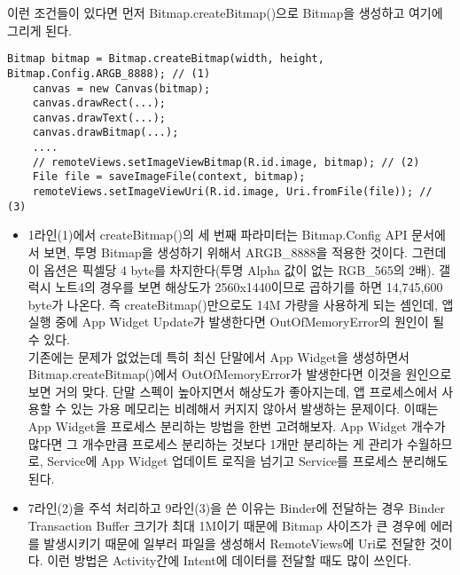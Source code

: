 이런 조건들이 있다면 먼저 Bitmap.createBitmap()으로 Bitmap을 생성하고 여기에 그리게 된다.
\begin{lstlisting}[frame=single] 
	Bitmap bitmap = Bitmap.createBitmap(width, height, Bitmap.Config.ARGB_8888); // (1)
	canvas = new Canvas(bitmap);
	canvas.drawRect(...);
	canvas.drawText(...);
	canvas.drawBitmap(...);
	....
	// remoteViews.setImageViewBitmap(R.id.image, bitmap); // (2)
	File file = saveImageFile(context, bitmap);
	remoteViews.setImageViewUri(R.id.image, Uri.fromFile(file)); // (3)
\end{lstlisting}
\begin{itemize}
\item 1라인(1)에서 createBitmap()의 세 번째 파라미터는 Bitmap.Config API 문서에서 보면, 투명 Bitmap을 생성하기 위해서 ARGB\_8888을 적용한 것이다.
그런데 이 옵션은 픽셀당 4 byte를 차지한다(투명 Alpha 값이 없는 RGB\_565의 2배). 갤럭시 노트4의 경우를 보면 해상도가 2560x1440이므로 곱하기를 하면 14,745,600 byte가 나온다. 즉 createBitmap()만으로도 14M 가량을 사용하게 되는 셈인데, 앱 실행 중에 App Widget Update가 발생한다면 OutOfMemoryError의 원인이 될 수 있다.\\

기존에는 문제가 없었는데 특히 최신 단말에서 App Widget을 생성하면서 Bitmap.createBitmap()에서 OutOfMemoryError가 발생한다면 이것을 원인으로 보면 거의 맞다.
단말 스펙이 높아지면서 해상도가 좋아지는데, 앱 프로세스에서 사용할 수 있는 가용 메모리는 비례해서 커지지 않아서 발생하는 문제이다.
이때는 App Widget을 프로세스 분리하는 방법을 한번 고려해보자.
App Widget 개수가 많다면 그 개수만큼 프로세스 분리하는 것보다 1개만 분리하는 게 관리가 수월하므로, Service에 App Widget 업데이트 로직을 넘기고 Service를 프로세스 분리해도 된다.

\item 7라인(2)을 주석 처리하고 9라인(3)을 쓴 이유는 Binder에 전달하는 경우 Binder Transaction Buffer 크기가  최대 1M이기 때문에 Bitmap 사이즈가 큰 경우에 에러를 발생시키기 때문에 일부러 파일을 생성해서 RemoteViews에 Uri로 전달한 것이다. 
이런 방법은 Activity간에 Intent에 데이터를 전달할 때도 많이 쓰인다. 
\end{itemize}
